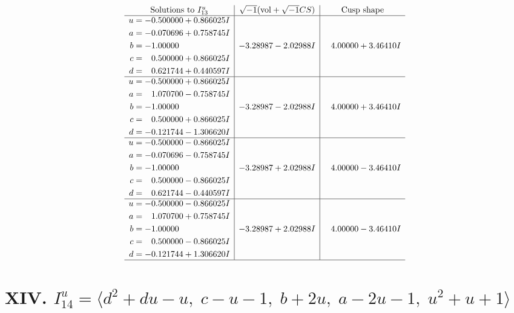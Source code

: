 \documentclass[1p]{elsarticle_modified}
\theoremstyle{definition}
\newcommand{\I}{\sqrt{-1}}
\begin{document}
$$\begin{array}{c|c|c}  
\text{Solutions to }I^u_{13}& \I (\text{vol} + \sqrt{-1}CS) & \text{Cusp shape}\\
 \hline 
\begin{aligned}
u &= -0.500000 + 0.866025 I \\
a &= -0.070696 + 0.758745 I \\
b &= -1.00000\phantom{ +0.000000I} \\
c &= \phantom{-}0.500000 + 0.866025 I \\
d &= \phantom{-}0.621744 + 0.440597 I\end{aligned}
 & -3.28987 - 2.02988 I & \phantom{-}4.00000 + 3.46410 I \\ \hline\begin{aligned}
u &= -0.500000 + 0.866025 I \\
a &= \phantom{-}1.070700 - 0.758745 I \\
b &= -1.00000\phantom{ +0.000000I} \\
c &= \phantom{-}0.500000 + 0.866025 I \\
d &= -0.121744 - 1.306620 I\end{aligned}
 & -3.28987 - 2.02988 I & \phantom{-}4.00000 + 3.46410 I \\ \hline\begin{aligned}
u &= -0.500000 - 0.866025 I \\
a &= -0.070696 - 0.758745 I \\
b &= -1.00000\phantom{ +0.000000I} \\
c &= \phantom{-}0.500000 - 0.866025 I \\
d &= \phantom{-}0.621744 - 0.440597 I\end{aligned}
 & -3.28987 + 2.02988 I & \phantom{-}4.00000 - 3.46410 I \\ \hline\begin{aligned}
u &= -0.500000 - 0.866025 I \\
a &= \phantom{-}1.070700 + 0.758745 I \\
b &= -1.00000\phantom{ +0.000000I} \\
c &= \phantom{-}0.500000 - 0.866025 I \\
d &= -0.121744 + 1.306620 I\end{aligned}
 & -3.28987 + 2.02988 I & \phantom{-}4.00000 - 3.46410 I\\
 \hline 
 \end{array}$$\newpage\newpage\renewcommand{\arraystretch}{1}
\centering \section*{XIV. $I^u_{14}= \langle d^2+d u- u,\;c- u-1,\;b+2 u,\;a-2 u-1,\;u^2+u+1 \rangle$}
\end{document}
